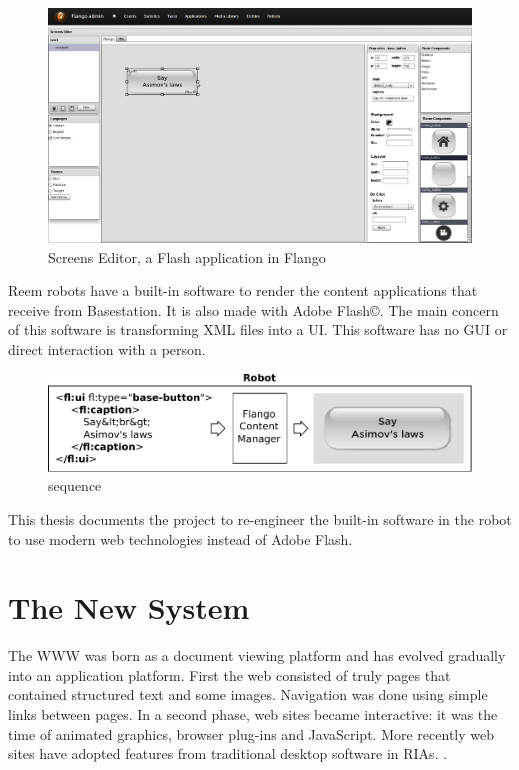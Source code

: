 \begin{figure}[htb]
    \label{fig:screens-editor}
    \centering
    \includegraphics[width=\textwidth]{figures/screens-editor}
    \caption{Screens Editor, a Flash application in Flango}
\end{figure}

Reem robots have a built-in software to render the content applications that receive from Basestation. 
It is also made with Adobe Flash\copyright.
The main concern of this software is transforming \ac{XML} files into a \ac{UI}. 
This software has no \ac{GUI} or direct interaction with a person.

\begin{figure}[htb]
    \label{fig:xml-flango-view}
    \centering
    \includegraphics[width=\textwidth]{figures/xml-flango-screenshot}
    \caption{sequence}
\end{figure}

This thesis documents the project to re-engineer the built-in software in the robot to use modern web technologies instead of Adobe Flash.

\section{The New System}
The \ac{WWW} was born as a document viewing platform and has evolved gradually into an application platform. 
First the web consisted of truly pages that contained structured text and some images. 
Navigation was done using simple links between pages. 
In a second phase, web sites became interactive: 
it was the time of animated graphics, browser plug-ins and JavaScript. 
More recently web sites have adopted features from traditional desktop software in \acp{RIA}. \cite{Anttonen:2011}.

